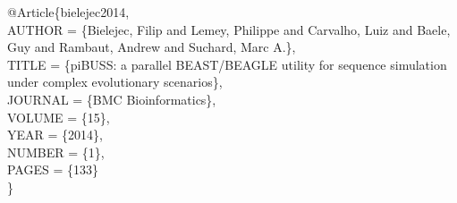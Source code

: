 \begin{code}
@Article\{bielejec2014, \\
AUTHOR = \{Bielejec, Filip and Lemey, Philippe and Carvalho, Luiz
and Baele, Guy and Rambaut, Andrew and Suchard, Marc A.\}, \\
TITLE = \{piBUSS: a parallel BEAST/BEAGLE utility for sequence simulation
under complex evolutionary scenarios\}, \\
JOURNAL = \{BMC Bioinformatics\}, \\
VOLUME = \{15\}, \\
YEAR = \{2014\}, \\
NUMBER = \{1\}, \\
PAGES = \{133\} \\
\}
\end{code}
